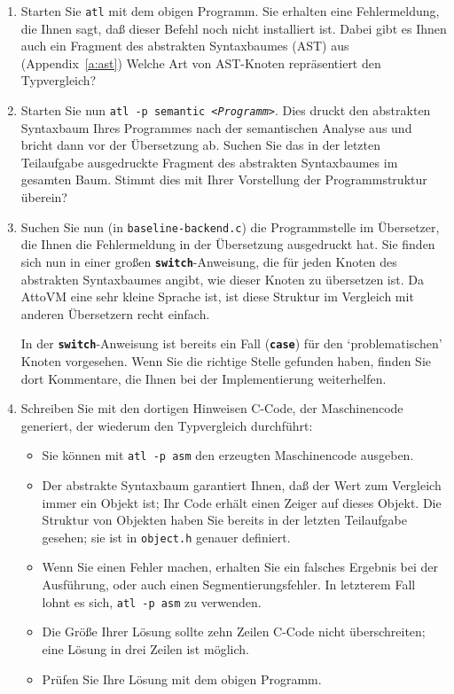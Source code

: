 \documentclass[11pt,a4paper]{article}
\newcommand{\Ckw}[1]{\textbf{\texttt{#1}}}
\begin{document}
\begin{enumerate}
  \item Starten Sie \texttt{atl} mit dem obigen Programm.  Sie erhalten eine Fehlermeldung, die Ihnen sagt, daß dieser Befehl noch nicht
    installiert ist.  Dabei gibt es Ihnen auch ein Fragment des abstrakten Syntaxbaumes (AST) aus (Appendix~\ref{a:ast})
    Welche Art von AST-Knoten repräsentiert den Typvergleich?

  \item 
    Starten Sie nun \texttt{atl -p semantic \emph{<Programm>}}.  Dies druckt den abstrakten Syntaxbaum Ihres Programmes nach der semantischen Analyse aus
    und bricht dann vor der Übersetzung ab.  Suchen Sie das in der letzten Teilaufgabe ausgedruckte Fragment des abstrakten Syntaxbaumes im gesamten
    Baum.  Stimmt dies mit Ihrer Vorstellung der Programmstruktur überein?

  \item Suchen Sie nun (in \texttt{baseline-backend.c}) die Programmstelle im Übersetzer, die Ihnen die Fehlermeldung in der Übersetzung ausgedruckt
    hat.  Sie finden sich nun in einer großen \Ckw{switch}-Anweisung, die für jeden Knoten des abstrakten Syntaxbaumes angibt, wie dieser Knoten
    zu übersetzen ist.  Da AttoVM eine sehr kleine Sprache ist, ist diese Struktur im Vergleich mit anderen Übersetzern recht einfach.

    In der \Ckw{switch}-Anweisung ist bereits ein Fall (\Ckw{case}) für den `problematischen' Knoten vorgesehen.  Wenn Sie die richtige Stelle
    gefunden haben, finden Sie dort Kommentare, die Ihnen bei der Implementierung weiterhelfen.

  \item Schreiben Sie mit den dortigen Hinweisen C-Code, der Maschinencode generiert, der wiederum den Typvergleich durchführt:
    \begin{itemize}
      \item Sie können mit \texttt{atl -p asm} den erzeugten Maschinencode ausgeben.
      \item Der abstrakte Syntaxbaum garantiert Ihnen, daß der Wert zum Vergleich immer ein Objekt ist; Ihr Code erhält einen Zeiger auf dieses Objekt.  Die Struktur von Objekten haben Sie
        bereits in der letzten Teilaufgabe gesehen; sie ist in \texttt{object.h} genauer definiert.
      \item Wenn Sie einen Fehler machen, erhalten Sie ein falsches Ergebnis bei der Ausführung, oder auch einen Segmentierungsfehler.
        In letzterem Fall lohnt es sich, \texttt{atl -p asm} zu verwenden.
      \item Die Größe Ihrer Lösung sollte zehn Zeilen C-Code nicht überschreiten; eine Lösung in drei Zeilen ist möglich.
      \item Prüfen Sie Ihre Lösung mit dem obigen Programm.
    \end{itemize}


\end{enumerate}
\end{document}
